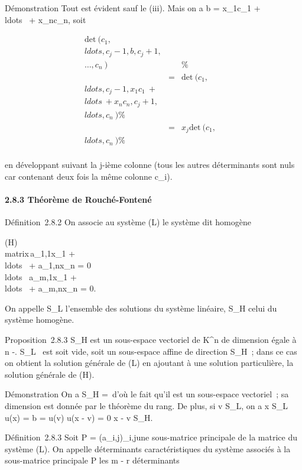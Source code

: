 \documentclass[]{article}
\begin{document}
Démonstration Tout est évident sauf le (iii). Mais on a b =
x_1c_1 +
\\ldots~ +
x_nc_n, soit

\begin{align*}
\mathrm{det}~
(c_1,\\ldots,c_j-1,b,c_j+1,\\\ldots,c_n~)&&
\%& \\ & =&
\mathrm{det}~
(c_1,\\ldots,c_j-1,x_1c_1~
+ \\ldots~ +
x_nc_n,c_j+1,\\ldots,c_n~)\%&
\\ & =&
x_j \mathrm{det}~
(c_1,\\ldots,c_n~)
\%& \\ \end{align*}

en développant suivant la j-ième colonne (tous les autres déterminants
sont nuls car contenant deux fois la même colonne c_i).

\paragraph{2.8.3 Théorème de Rouché-Fontené}

Définition~2.8.2 On associe au système (L) le système dit homogène

(H)\quad \left
\\matrix\,a_1,1x_1
+ \\ldots~ +
a_1,nx_n = 0 \cr
\\ldots~
\cr a_m,1x_1 +
\\ldots~ +
a_m,nx_n = 0\right .

On appelle S_L l'ensemble des solutions du système linéaire,
S_H celui du système homogène.

Proposition~2.8.3 S_H est un sous-espace vectoriel de
K^n de dimension égale à n
-\mathrmrgL. S_L~
est soit vide, soit un sous-espace affine de direction S_H~;
dans ce cas on obtient la solution générale de (L) en ajoutant à une
solution particulière, la solution générale de (H).

Démonstration On a S_H =\
\mathrmKeru d'où le fait qu'il est un sous-espace
vectoriel~; sa dimension est donnée par le théorème du rang. De plus, si
v \in S_L, on a x \in S_L \Leftrightarrow
u(x) = b = u(v) \Leftrightarrow u(x - v) = 0
\Leftrightarrow x - v \in S_H.

Définition~2.8.3 Soit P = (a_i,j)_i\inI,j\inJ une
sous-matrice principale de la matrice du système (L). On appelle
déterminants caractéristiques du système associés à la sous-matrice
principale P les m - r déterminants
\end{document}
